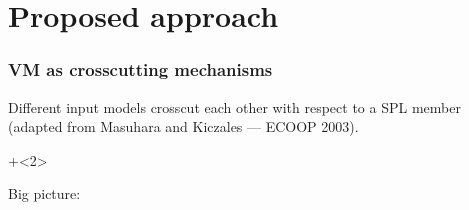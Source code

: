 \documentclass[xcolor=svgnames]{beamer}
\begin{document}
% 
% 
% 
\section{Proposed approach}

\begin{frame}
\frametitle{VM as crosscutting mechanisms}

Different input models crosscut each other with respect to a SPL member
(adapted from Masuhara and Kiczales --- ECOOP 2003).

\onslide+<2>
\begin{block}{Big picture:}
\end{block}

\end{frame}
\end{document}
